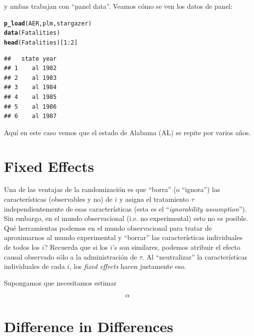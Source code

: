 \documentclass[onesided]{article}\usepackage[]{graphicx}\usepackage[]{color}
\makeatletter
\newcommand{\hlnum}[1]{\textcolor[rgb]{0.686,0.059,0.569}{#1}}%
\newcommand{\hlopt}[1]{\textcolor[rgb]{0,0,0}{#1}}%
\newcommand{\hlstd}[1]{\textcolor[rgb]{0.345,0.345,0.345}{#1}}%
\newcommand{\hlkwd}[1]{\textcolor[rgb]{0.737,0.353,0.396}{\textbf{#1}}}%
\newenvironment{kframe}{%
 \def\at@end@of@kframe{}%
 \ifinner\ifhmode%
  \def\at@end@of@kframe{\end{minipage}}%
  \begin{minipage}{\columnwidth}%
 \fi\fi%
 \def\FrameCommand##1{\hskip\@totalleftmargin \hskip-\fboxsep
 \colorbox{shadecolor}{##1}\hskip-\fboxsep
     \hskip-\linewidth \hskip-\@totalleftmargin \hskip\columnwidth}%
 \MakeFramed {\advance\hsize-\width
   \@totalleftmargin\z@ \linewidth\hsize
   \@setminipage}}%
 {\par\unskip\endMakeFramed%
 \at@end@of@kframe}
\newenvironment{knitrout}{}{} %
\makeatother
\begin{document}
y ambas trabajan con ``panel data''. Veamos c\'omo se ven los datos de panel:

\begin{knitrout}
\color{fgcolor}\begin{kframe}
\begin{alltt}
\hlkwd{p_load}\hlstd{(AER, plm, stargazer)}
\hlkwd{data}\hlstd{(Fatalities)}
\hlkwd{head}\hlstd{(Fatalities)[}\hlnum{1}\hlopt{:}\hlnum{2}\hlstd{]}
\end{alltt}
\begin{verbatim}
##   state year
## 1    al 1982
## 2    al 1983
## 3    al 1984
## 4    al 1985
## 5    al 1986
## 6    al 1987
\end{verbatim}
\end{kframe}
\end{knitrout}

Aqu\'i en este caso vemos que el estado de Alabama (AL) se repite por varios a\~nos.


\section{Fixed Effects}

Una de las ventajas de la randomizaci\'on es que ``borra'' (o ``ignora'') las caracter\'isticas (observables y no) de $i$ y asigna el tratamiento $\tau$ independientemente de esas caracter\'isticas (esta es el ``\emph{ignorability assumption}''). Sin embargo, en el mundo observacional (i.e. no experimental) esto no es posible. Qu\'e herramientas podemos en el mundo observacional para tratar de aproximarnos al mundo experimental y ``borrar'' las caracter\'isticas individuales de todos los $i$? Recuerda que si los $i$'s son similares, podemos atribuir el efecto causal observado s\'olo a la administraci\'on de $\tau$. Al ``neutralizar'' la caracter\'isticas individuales de cada $i$, los \emph{fixed effects} hacen justamente eso. 

Supongamos que necesitamos estimar 

\begin{equation}\label{fe}
\alpha
\end{equation}


\section{Difference in Differences}
\end{document}
